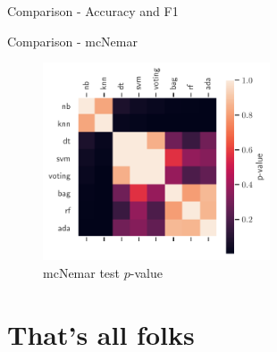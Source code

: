 \documentclass[aspectratio=169]{beamer}
\begin{document}
\begin{frame}{Comparison - Accuracy and F1}
\begin{table}[H]
\centering
\caption{Comparison of metrics}%
\label{tab:comparison}

\end{table}
\end{frame}

\begin{frame}{Comparison - mcNemar}
\begin{figure}[H]
\centering
\includegraphics[width=0.6\textwidth]{chi_mcnemar_pvalue}
\caption{mcNemar test $p$-value}
\end{figure}
\end{frame}

\section{That's all folks}
\end{document}
